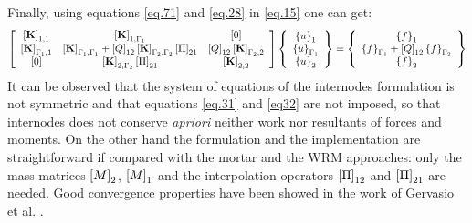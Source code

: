 Finally, using equations \eqref{eq.71} and \eqref{eq.28} in \eqref{eq.15} one can get:
\begin{equation}
\label{eq.72}
\begin{aligned}
\left[ \begin{array}{ccc} 
    \left[{\mathbf{K}}\right]_{1,1} & \left[{\mathbf{K}}\right]_{1,\Gamma_1} & \left[{0}\right] \\
   \left[{\mathbf{K}}\right]_{\Gamma_1,1} & \left[{\mathbf{K}}\right]_{\Gamma_1,\Gamma_1}+ \left[{Q}\right]_{12}\left[{\mathbf{K}}\right]_{\Gamma_2,\Gamma_2}\left[{\Pi}\right]_{21} & \left[{Q}\right]_{12}\left[{\mathbf{K}}\right]_{\Gamma_2,2}\\   
    \left[{0}\right] & \left[{\mathbf{K}}\right]_{2,\Gamma_2}\left[{\Pi}\right]_{21} & \left[{\mathbf{K}}\right]_{2,2}\end{array} \right] \left\lbrace \begin{array}{c} \left\lbrace{u}\right \rbrace_1\\\left\lbrace{u}\right \rbrace_{\Gamma_1}\\\left\lbrace{u}\right \rbrace_2
    \end{array}\right\rbrace= \left\lbrace\begin{array}{c} \left\lbrace{f}\right \rbrace_1\\\left\lbrace{f}\right \rbrace_{\Gamma_1}+\left[{Q}\right]_{12}\left\lbrace{f}\right \rbrace_{\Gamma_2}\\\left\lbrace{f}\right \rbrace_2
    \end{array}\right\rbrace
    \end{aligned}
\end{equation}
It can be observed that the system of equations of the internodes formulation is not symmetric and that equations \eqref{eq.31} and \eqref{eq32} are not imposed, so that internodes does not conserve \textit{apriori} neither work nor resultants of forces and moments. On the other hand the formulation and the implementation are straightforward if compared with the mortar and the WRM approaches: only the mass matrices $\left[{M}\right]_2$, $\left[{M}\right]_1$ and the interpolation operators $\left[{\Pi}\right]_{12}$ and $\left[{\Pi}\right]_{21}$ are needed. Good convergence properties have been showed in the work of Gervasio et al. \cite{gervasio2016analysis}.
